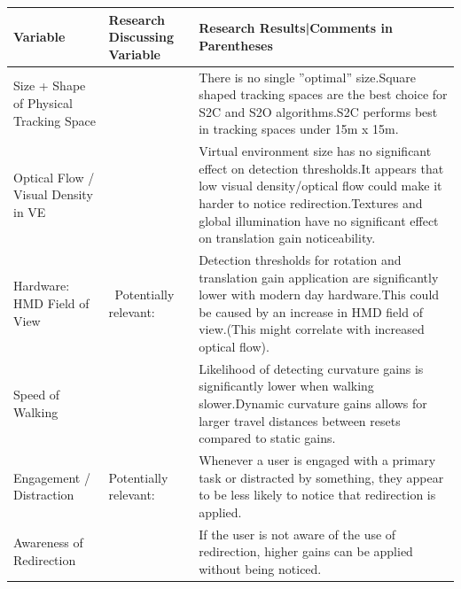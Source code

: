 \begin{table}[!h]
\centering
\begin{tabularx}{\textwidth}{|m{2cm}|m{1.7cm}|m{10.1cm}|} 
\hline
Variable & Research Discussing Variable & Research Results|Comments in Parentheses\\
\hline
Size + Shape of Physical Tracking Space & 
\cite{azmandian2015physical} & 
There is no single ''optimal'' size.\newline Square shaped tracking spaces are the best choice for S2C and S2O algorithms.\newline S2C performs best in tracking spaces under 15m x 15m.\\
\hline
Optical Flow / Visual Density in VE & ~\cite{8446225, steinicke2008moving, 8446216, waldow2018textures} & Virtual environment size has no significant effect on detection thresholds.\newline It appears that low visual density/optical flow could make it harder to notice redirection.\newline Textures and global illumination have no significant effect on translation gain noticeability.\\
\hline
Hardware: HMD Field of View &
~\cite{fuglestad2018redirected}\newline Potentially relevant:\newline\cite{norouzi2018assessing} &
Detection thresholds for rotation and translation gain application are significantly lower with modern day hardware.\newline This could be caused by an increase in HMD field of view.\newline(This might correlate with increased optical flow).\\
\hline
Speed of Walking & \cite{5759454} & Likelihood of detecting curvature gains is significantly lower when walking slower.\newline Dynamic curvature gains allows for larger travel distances between resets compared to static gains.\\
\hline
Engagement / Distraction & \cite{5072212, schmitz2018you, sra2018vmotion}\newline Potentially relevant:\newline\cite{norouzi2018assessing, 5759454} & Whenever a user is engaged with a primary task or distracted by something, they appear to be less likely to notice that redirection is applied.\\
\hline
Awareness of Redirection & \cite{5072212} & If the user is not aware of the use of redirection, higher gains can be applied without being noticed.\\

\end{tabularx}
\end{table}
